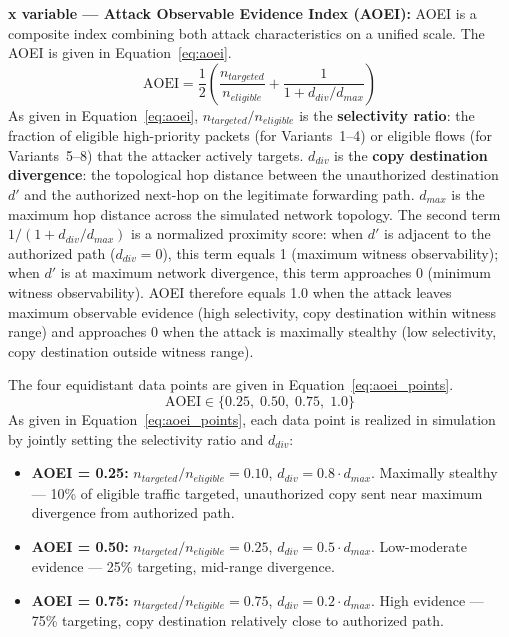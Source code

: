 \documentclass[12pt, a4paper]{report}
\begin{document}
{{\textbf{x variable — Attack Observable Evidence
Index (AOEI):}
AOEI is a composite index combining both attack
characteristics on a unified scale. The AOEI is
given in Equation~\eqref{eq:aoei}.
\begin{equation}
\text{AOEI} =
\frac{1}{2}
\left(
\frac{n_{targeted}}{n_{eligible}}
+
\frac{1}{1 + d_{div}/d_{max}}
\right)
\label{eq:aoei}
\end{equation}
As given in Equation~\eqref{eq:aoei},
$n_{targeted}/n_{eligible}$ is the
\textbf{selectivity ratio}: the fraction of
eligible high-priority packets (for Variants~1--4)
or eligible flows (for Variants~5--8) that the
attacker actively targets. $d_{div}$ is the
\textbf{copy destination divergence}: the
topological hop distance between the unauthorized
destination $d'$ and the authorized next-hop on
the legitimate forwarding path. $d_{max}$ is the
maximum hop distance across the simulated network
topology. The second term $1/(1 + d_{div}/d_{max})$
is a normalized proximity score: when $d' $ is
adjacent to the authorized path ($d_{div} = 0$),
this term equals 1 (maximum witness observability);
when $d'$ is at maximum network divergence, this
term approaches 0 (minimum witness observability).
AOEI therefore equals 1.0 when the attack leaves
maximum observable evidence (high selectivity,
copy destination within witness range) and
approaches 0 when the attack is maximally
stealthy (low selectivity, copy destination
outside witness range).

The four equidistant data points are given in
Equation~\eqref{eq:aoei_points}.
\begin{equation}
\text{AOEI} \in
\{0.25,\; 0.50,\; 0.75,\; 1.0\}
\label{eq:aoei_points}
\end{equation}
As given in Equation~\eqref{eq:aoei_points}, each
data point is realized in simulation by jointly
setting the selectivity ratio and $d_{div}$:
\begin{itemize}
    \item \textbf{AOEI = 0.25:}
    $n_{targeted}/n_{eligible} = 0.10$,
    $d_{div} = 0.8 \cdot d_{max}$.
    Maximally stealthy — 10\% of eligible
    traffic targeted, unauthorized copy sent
    near maximum divergence from authorized path.

    \item \textbf{AOEI = 0.50:}
    $n_{targeted}/n_{eligible} = 0.25$,
    $d_{div} = 0.5 \cdot d_{max}$.
    Low-moderate evidence — 25\% targeting,
    mid-range divergence.

    \item \textbf{AOEI = 0.75:}
    $n_{targeted}/n_{eligible} = 0.75$,
    $d_{div} = 0.2 \cdot d_{max}$.
    High evidence — 75\% targeting, copy
    destination relatively close to authorized path.


\end{itemize}}}
\end{document}
